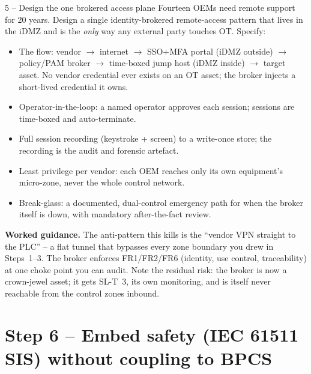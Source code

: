 \documentclass[11pt,a4paper]{article}
\begin{document}
\begin{stepbox}{5 -- Design the one brokered access plane}
Fourteen OEMs need remote support for 20 years. Design a single
identity-brokered remote-access pattern that lives in the iDMZ and is the
\emph{only} way any external party touches OT. Specify:
\begin{itemize}\setlength{\itemsep}{1pt}
  \item The flow: vendor $\to$ internet $\to$ SSO+MFA portal (iDMZ
    outside) $\to$ policy/PAM broker $\to$ time-boxed jump host (iDMZ
    inside) $\to$ target asset. No vendor credential ever exists on an
    OT asset; the broker injects a short-lived credential it owns.
  \item Operator-in-the-loop: a named operator approves each session;
    sessions are time-boxed and auto-terminate.
  \item Full session recording (keystroke + screen) to a write-once
    store; the recording is the audit and forensic artefact.
  \item Least privilege per vendor: each OEM reaches only its own
    equipment's micro-zone, never the whole control network.
  \item Break-glass: a documented, dual-control emergency path for when
    the broker itself is down, with mandatory after-the-fact review.
\end{itemize}

\medskip
\noindent\textbf{Worked guidance.} The anti-pattern this kills is the
``vendor VPN straight to the PLC'' -- a flat tunnel that bypasses every
zone boundary you drew in Steps~1--3. The broker enforces FR1/FR2/FR6
(identity, use control, traceability) at one choke point you can audit.
Note the residual risk: the broker is now a crown-jewel asset; it gets
SL-T~3, its own monitoring, and is itself never reachable from the
control zones inbound.
\end{stepbox}

\section*{Step 6 -- Embed safety (IEC 61511 SIS) without coupling to BPCS}
\end{document}
